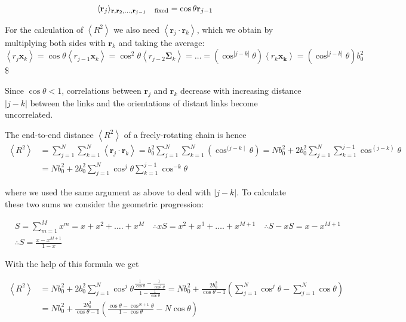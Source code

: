 \documentclass[
  letterpaper,
  enabledeprecatedfontcommands]{report}
\begin{document}
\[\langle \mathbf{r}_{j} \rangle_{\mathbf{r}, \mathbf{r}_{2}, \ldots, \mathbf{r}_{j-1}\quad {\rm fixed}}=\cos \theta \mathbf{r}_{j-1}\]

For the calculation of \(\left\langle R^{2}\right\rangle\) we also need
\(\left\langle\mathbf{r}_{j} \cdot \mathbf{r}_{k}\right\rangle\), which
we obtain by multiplying both sides with \(\mathbf{r}_{k}\) and taking
the average:
\(\left\langle r_{j} \mathbf{x}_{k}\right\rangle=\cos \theta\left\langle r_{j-1} \mathbf{x}_{k}\right\rangle=\cos ^{2} \theta\left\langle r_{j-2} \mathbf{\Sigma}_{k}\right\rangle=\ldots=\left(\cos ^{|j-k|} \theta\right)\left\langle r_{k}{\mathbf{x_{k}}}\right\rangle=\left(\cos ^{|j-k|} \theta\right) b_{0}^{2}\)\$

Since \(\cos \theta<1\), correlations between \(\mathbf{r}_{j}\) and
\(\mathbf{r}_{k}\) decrease with increasing distance \(|j-k|\) between
the links and the orientations of distant links become uncorrelated.

The end-to-end distance \(\left\langle R^{2}\right\rangle\) of a
freely-rotating chain is hence \[
\begin{aligned}
\left\langle R^{2}\right\rangle & =\sum_{j=1}^{N} \sum_{k=1}^{N}\left\langle\mathbf{r}_{j} \cdot \mathbf{r}_{k}\right\rangle=b_{0}^{2} \sum_{j=1}^{N} \sum_{k=1}^{N}\left(\cos ^{(j-k \mid} \theta\right)=N b_{0}^{2}+2 b_{0}^{2} \sum_{j=1}^{N} \sum_{k=1}^{j-1} \cos ^{(j-k)} \theta \\
& =N b_{0}^{2}+2 b_{0}^{2} \sum_{j=1}^{N} \cos ^{j} \theta \sum_{k=1}^{j-1} \cos ^{-k} \theta
\end{aligned}
\]

where we used the same argument as above to deal with \(|j-k|\). To
calculate these two sums we consider the geometric progression:

\[
\begin{aligned}
& S=\sum_{m=1}^{M} x^{m}=x+x^{2}+\ldots .+x^{M} \quad \therefore x S=x^{2}+x^{3}+\ldots .+x^{M+1} \quad \therefore S-x S=x-x^{M+1} \\
& \therefore S=\frac{x-x^{M+1}}{1-x}
\end{aligned}
\]

With the help of this formula we get

\[
\begin{aligned}
\left\langle R^{2}\right\rangle & =N b_{0}^{2}+2 b_{0}^{2} \sum_{j=1}^{N} \cos ^{j} \theta \frac{\frac{1}{\cos \theta}-\frac{1}{\cos ^{j} \theta}}{1-\frac{1}{\cos \theta}}=N b_{0}^{2}+\frac{2 b_{0}^{2}}{\cos \theta-1}\left(\sum_{j=1}^{N} \cos ^{j} \theta-\sum_{j=1}^{N} \cos \theta\right) \\
& =N b_{0}^{2}+\frac{2 b_{0}^{2}}{\cos \theta-1}\left(\frac{\cos \theta-\cos ^{N+1} \theta}{1-\cos \theta}-N \cos \theta\right)
\end{aligned}
\]
\end{document}
